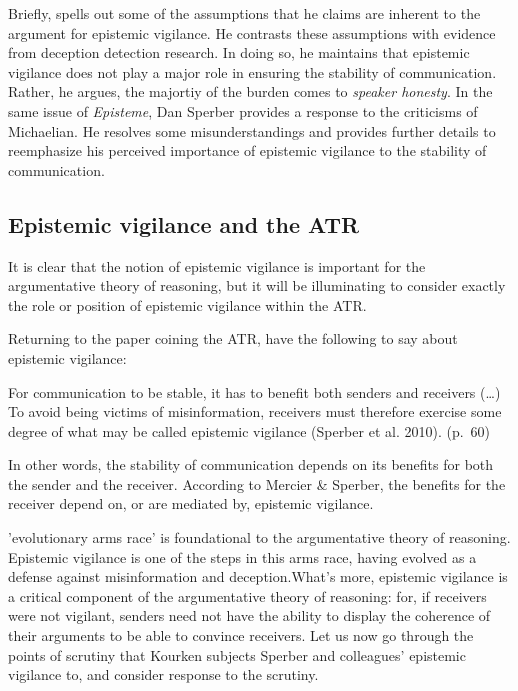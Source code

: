 Briefly, \citet{Michaelian13} spells out some of the assumptions that he claims are inherent to the argument for epistemic vigilance. He contrasts these assumptions with evidence from deception detection research. In doing so, he maintains that epistemic vigilance does not play a major role in ensuring the stability of communication. Rather, he argues, the majortiy of the burden comes to \emph{speaker honesty}. In the same \citeyear{Sperber13} issue of \emph{Episteme}, Dan Sperber provides a response to the criticisms of Michaelian. He resolves some misunderstandings and provides further details to reemphasize his perceived importance of epistemic vigilance to the stability of communication.


\subsection{Epistemic vigilance and the ATR}
\label{sec:epi-vigil-atr}

It is clear that the notion of epistemic vigilance is important for the argumentative theory of reasoning, but it will be illuminating to consider exactly the role or position of epistemic vigilance within the ATR.

Returning to the paper coining the ATR, \citet{MS11} have the following to say about epistemic vigilance:

\begin{quoting}
    For communication to be stable, it has to benefit both senders and receivers (\ldots) To avoid being victims of misinformation, receivers must therefore exercise some degree of what may be called epistemic vigilance (Sperber et al. 2010).
\hfill (p.~60)
\end{quoting}
In other words, the stability of communication depends on its benefits for both the sender and the receiver. According to Mercier \& Sperber, the benefits for the receiver depend on, or are mediated by, epistemic vigilance.

 'evolutionary arms race' is foundational to the argumentative theory of reasoning. Epistemic vigilance is one of the steps in this arms race, having evolved as a defense against misinformation and deception.What's more, epistemic vigilance is a critical component of the argumentative theory of reasoning: for, if receivers were not vigilant, senders need not have the ability to display the coherence of their arguments to be able to convince receivers.
Let us now go through the points of scrutiny that Kourken \citet{Michaelian13} subjects Sperber and colleagues' epistemic vigilance to, and consider  response to the scrutiny.


